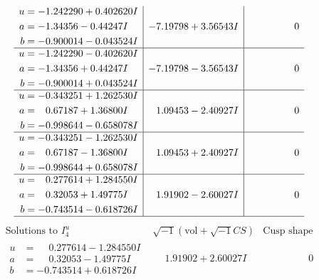 \documentclass[1p]{elsarticle_modified}
\theoremstyle{definition}
\newcommand{\I}{\sqrt{-1}}
\begin{document}
$$\begin{array}{c|c|c}
\begin{aligned}
u &= -1.242290 + 0.402620 I \\
a &= -1.34356 - 0.44247 I \\
b &= -0.900014 - 0.043524 I\end{aligned}
 & -7.19798 + 3.56543 I & \phantom{-0.000000 } 0 \\ \hline\begin{aligned}
u &= -1.242290 - 0.402620 I \\
a &= -1.34356 + 0.44247 I \\
b &= -0.900014 + 0.043524 I\end{aligned}
 & -7.19798 - 3.56543 I & \phantom{-0.000000 } 0 \\ \hline\begin{aligned}
u &= -0.343251 + 1.262530 I \\
a &= \phantom{-}0.67187 + 1.36800 I \\
b &= -0.998644 - 0.658078 I\end{aligned}
 & \phantom{-}1.09453 - 2.40927 I & \phantom{-0.000000 } 0 \\ \hline\begin{aligned}
u &= -0.343251 - 1.262530 I \\
a &= \phantom{-}0.67187 - 1.36800 I \\
b &= -0.998644 + 0.658078 I\end{aligned}
 & \phantom{-}1.09453 + 2.40927 I & \phantom{-0.000000 } 0 \\ \hline\begin{aligned}
u &= \phantom{-}0.277614 + 1.284550 I \\
a &= \phantom{-}0.32053 + 1.49775 I \\
b &= -0.743514 - 0.618726 I\end{aligned}
 & \phantom{-}1.91902 - 2.60027 I & \phantom{-0.000000 } 0\\
 \hline 
 \end{array}$$\newpage$$\begin{array}{c|c|c}  
\text{Solutions to }I^u_{4}& \I (\text{vol} + \sqrt{-1}CS) & \text{Cusp shape}\\
 \hline 
\begin{aligned}
u &= \phantom{-}0.277614 - 1.284550 I \\
a &= \phantom{-}0.32053 - 1.49775 I \\
b &= -0.743514 + 0.618726 I\end{aligned}
 & \phantom{-}1.91902 + 2.60027 I & \phantom{-0.000000 } 0 \\ \hline\begin{aligned}

\end{aligned}
\end{array}$$
\end{document}
